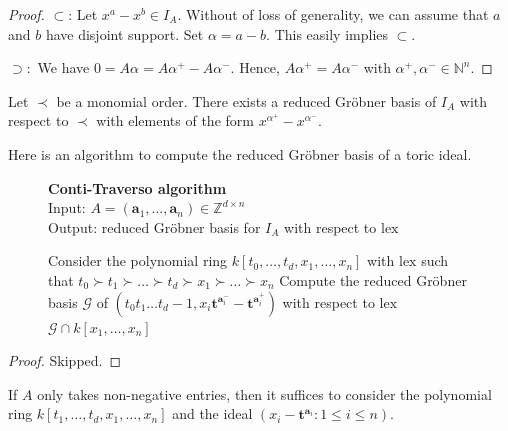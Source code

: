 \documentclass[a4paper, 11pt]{article}
\begin{document}
\begin{proof}
  \( \subset \): Let \( x^a - x^b \in I_A \). Without of loss of generality, we can assume that \( a \) and \( b \) have disjoint support. Set \( \alpha = a-b \). This easily implies \( \subset \).

  \( \supset: \) We have \( 0 = A\alpha = A{\alpha^+ - A\alpha^-}  \). Hence, \( A \alpha^+ = A \alpha^- \) with \( \alpha^+,\alpha^- \in \mathbb N^n \).
\end{proof}

\begin{cor}
  Let \( \prec \) be a monomial order.
  There exists a reduced Gröbner basis of \( I_A \) with respect to \( \prec \) with elements of the form \( x^{\alpha^+} - x^{\alpha^-}\).
\end{cor}


Here is an algorithm to compute the reduced Gröbner basis of a toric ideal.

\begin{figure}[H]
  \begin{mdframed}
    \textbf{Conti-Traverso algorithm}\\
    Input: \( A = (\mathbf a_1, \dots , \mathbf a_n) \in \mathbb Z^{d \times n}\)\\
    Output: reduced Gröbner basis for \( I_A \) with respect to \( \mathrm{lex} \)
  
    \begin{algorithmic}[1]
      \State Consider the polynomial ring \( k[t_0, \dots, t_d, x_1, \dots, x_n] \) with \( \mathrm{lex} \) such that \( t_0 \succ t_1 \succ \dots \succ t_d \succ x_1 \succ \dots \succ x_n \)
      \State Compute the reduced Gröbner basis \( \mathcal{G} \) of \( (t_0t_1 \dots t_d - 1,  x_i \mathbf t^{\mathbf{a}^{-}_i} - \mathbf t^{\mathbf a_i^{+}}) \) with respect to \( \mathrm{lex} \)
      \State \Return \( \mathcal{G}  \cap k[x_1, \dots , x_n]\)
    \end{algorithmic}
  \end{mdframed}
\end{figure}

\begin{proof}
  Skipped.
\end{proof}

\begin{remark}
  If \( A \) only takes non-negative entries, then it suffices to consider the polynomial ring \( k[t_1, \dots, t_d, x_1, \dots, x_n] \) and the ideal \( (x_i - \mathbf t^{\mathbf a_i} : 1 \leq i \leq n) \).
\end{remark}
\end{document}
